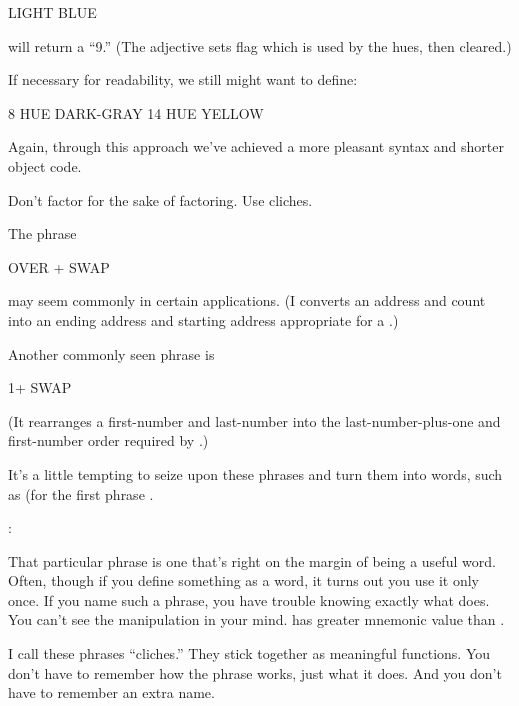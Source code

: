 \begin{Code}
LIGHT BLUE
\end{Code}
will return a ``9.'' (The adjective  sets flag which is
used by the hues, then cleared.)

\goodbreak
If necessary for readability, we still might want to define:

\begin{Code}
8 HUE DARK-GRAY
14 HUE YELLOW
\end{Code}
Again, through this approach we've achieved a more pleasant syntax and
shorter object code.

\begin{tip}
Don't factor for the sake of factoring. Use cliches.
\end{tip}
The phrase

\begin{Code}
OVER + SWAP
\end{Code}
may seem commonly in certain applications. (I converts an address and
count into an ending address and starting address appropriate for a
.)

Another commonly seen phrase is

\begin{Code}
1+ SWAP
\end{Code}
(It rearranges a first-number and last-number into the
last-number-plus-one and first-number order required by .)

It's a little tempting to seize upon these phrases and turn them into
words, such as (for the first phrase .

\begin{interview}
:

\begin{tfquot}
That particular phrase  is one that's right on
the margin of being a useful word. Often, though if you define
something as a word, it turns out you use it only once. If you name
such a phrase, you have trouble knowing exactly what 
does. You can't see the manipulation in your mind.  has greater mnemonic value than .
\end{tfquot}
\end{interview}
I call these phrases ``cliches.'' They stick together as meaningful
functions. You don't have to remember how the phrase works, just what
it does. And you don't have to remember an extra name.

